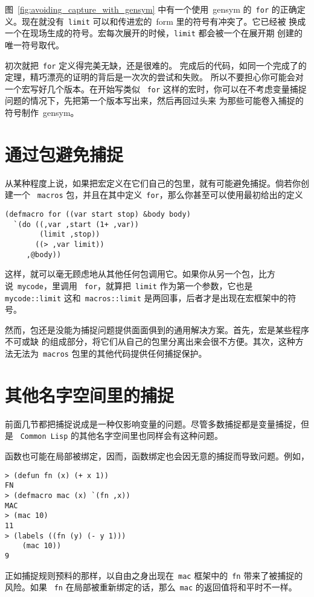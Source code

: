图~\ref{fig:avoiding_capture_with_gensym} 中有一个使用~gensym 的~\verb|for|
的正确定义。现在就没有~\verb|limit| 可以和传进宏的~form 里的符号有冲突了。它已经被
换成一个在现场生成的符号。宏每次展开的时候，\verb|limit| 都会被一个在展开期
创建的唯一符号取代。

初次就把~\verb|for|\label{macro:for} 定义得完美无缺，还是很难的。
完成后的代码，如同一个完成了的定理，精巧漂亮的证明的背后是一次次的尝试和失败。
所以不要担心你可能会对一个宏写好几个版本。在开始写类似
~\texttt{for} 这样的宏时，你可以在不考虑变量捕捉问题的情况下，先把第一个版本写出来，然后再回过头来
为那些可能卷入捕捉的符号制作~gensym。

\section{通过包避免捕捉}
\label{sec:avoiding_capture_with_packages}

从某种程度上说，如果把宏定义在它们自己的包里，就有可能避免捕捉。倘若你创建一个
~\texttt{macros} 包，并且在其中定义~\texttt{for}，那么你甚至可以使用最初给出的定义
\begin{lstlisting}
(defmacro for ((var start stop) &body body)
  `(do ((,var ,start (1+ ,var))
        (limit ,stop))
       ((> ,var limit))
     ,@body))
\end{lstlisting}
这样，就可以毫无顾虑地从其他任何包调用它。如果你从另一个包，比方说~\texttt{mycode}，里调用
~\texttt{for}，就算把~\texttt{limit} 作为第一个参数，它也是
\texttt{mycode::limit}\pozhehao{}
这和~\texttt{macros::limit} 是两回事，后者才是出现在宏框架中的符号。

然而，包还是没能为捕捉问题提供面面俱到的通用解决方案。首先，宏是某些程序不可或缺
的组成部分，将它们从自己的包里分离出来会很不方便。其次，这种方法无法为~\texttt{macros}
包里的其他代码提供任何捕捉保护。

\section{其他名字空间里的捕捉}
\label{sec:capture_in_other_name-spaces}

前面几节都把捕捉说成是一种仅影响变量的问题。尽管多数捕捉都是变量捕捉，但是
~\texttt{Common Lisp} 的其他名字空间里也同样会有这种问题。

函数也可能在局部被绑定，因而，函数绑定也会因无意的捕捉而导致问题。例如，
\begin{lstlisting}
> (defun fn (x) (+ x 1))
FN
> (defmacro mac (x) `(fn ,x))
MAC
> (mac 10)
11
> (labels ((fn (y) (- y 1)))
    (mac 10))
9
\end{lstlisting}
正如捕捉规则预料的那样，以自由之身出现在~\verb|mac| 框架中的~\verb|fn| 带来了被捕捉的风险。如果
~\verb|fn| 在局部被重新绑定的话，那么~\verb|mac| 的返回值将和平时不一样。

